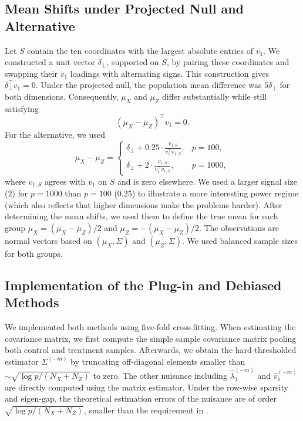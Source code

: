 \documentclass[11pt]{article}
\newenvironment{revblock}
  {\color{teal}}
  {}
\begin{document}
\begin{revblock}
\subsection{Mean Shifts under Projected Null and Alternative}

Let $S$ contain the ten coordinates with the largest absolute entries of
$v_1$. We constructed a unit vector $\delta_\perp$, supported on $S$, by
pairing these coordinates and swapping their $v_1$ loadings with alternating
signs. This construction gives $\delta_\perp^\top v_1=0$. Under the projected
null, the population mean difference was $5\delta_\perp$ for both dimensions.
Consequently, $\mu_X$ and $\mu_Z$ differ substantially while
still satisfying
\[
(\mu_X-\mu_Z)^\top v_1=0.
\]
For the alternative, we used
\[
\mu_X-\mu_Z=
\begin{cases}
\displaystyle
\delta_\perp+0.25\cdot \frac{v_{1,S}}{v_1^\top v_{1,S}}, & p=100,\\[8pt]
\displaystyle
\delta_\perp+2\cdot \frac{v_{1,S}}{v_1^\top v_{1,S}}, & p=1000,
\end{cases}
\]
where $v_{1,S}$ agrees with $v_1$ on $S$ and is zero elsewhere. We used a larger signal size ($2$) for $p=1000$ than $p = 100$ ($0.25$) to illustrate a more interesting power regime (which also reflects that higher dimensions make the problems harder). After determining the mean shifts, we used them to define the true mean for each group $\mu_X=(\mu_X-\mu_Z)/2$ and $\mu_Z=-(\mu_X-\mu_Z)/2$. The observations are normal vectors based on $(\mu_X, \Sigma)$ and $(\mu_Z, \Sigma)$. We used balanced sample sizes for both groups.

\subsection{Implementation of the Plug-in and Debiased Methods}

We implemented both methods using five-fold cross-fitting. When estimating the covariance matrix, we first compute the simple sample covariance matrix pooling both control and treatment samples. Afterwards, we obtain the hard-thresholded estimator $\Sigma^{(-m)}$ by truncating off-diagonal elements smaller than $\sim \sqrt{\log p / (N_X + N_Z)}$ to zero. The other nuisance including $\widehat{\lambda}_1^{(-m)}$ and $\widehat{v}_1^{(-m)}$ are directly computed using the matrix estimator. Under the row-wise sparsity and eigen-gap, the theoretical estimation errors of the nuisance are of order $\sqrt{\log p / (N_X + N_Z)}$, smaller than the requirement in .


\end{revblock}
\end{document}

